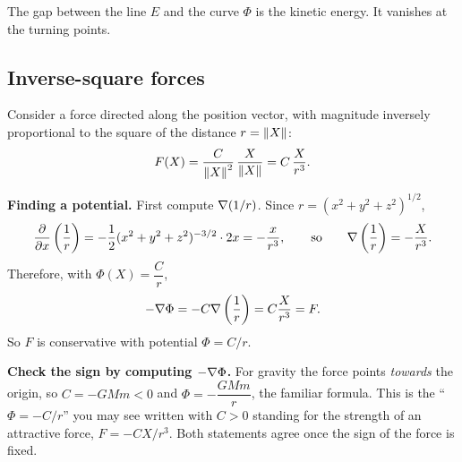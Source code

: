 \begin{center}

{\small\color{navy} The gap between the line $E$ and the curve $\Phi$ is the kinetic
energy. It vanishes at the turning points.}
\end{center}

\subsection{Inverse-square forces}

Consider a force directed along the position vector, with magnitude inversely
proportional to the square of the distance $r=\left\lVert X\right\rVert$:
\[ F(X)=\frac{C}{\left\lVert X\right\rVert^2}\,\frac{X}{\left\lVert X\right\rVert}=C\,\frac{X}{r^3}. \]

\textbf{Finding a potential.} First compute $\nabla(1/r)$. Since
$r=(x^2+y^2+z^2)^{1/2}$,
\[
\frac{\partial }{\partial x}\left(\frac1r\right)=-\frac12(x^2+y^2+z^2)^{-3/2}\cdot2x=-\frac{x}{r^3},
\qquad\text{so}\qquad \nabla\left(\frac1r\right)=-\frac{X}{r^3}.
\]
Therefore, with $\Phi(X)=\dfrac{C}{r}$,
\[ -\nabla\Phi=-C\nabla\left(\frac1r\right)=C\frac{X}{r^3}=F . \]
So $F$ is conservative with potential $\Phi=C/r$.

\begin{trap}
\textbf{Check the sign by computing $-\nabla\Phi$.} For gravity the force points
\emph{towards} the origin, so $C=-GMm<0$ and $\Phi=-\dfrac{GMm}{r}$, the familiar formula.
This is the ``$\Phi=-C/r$'' you may see written with $C>0$ standing for the strength of an
attractive force, $F=-C X/r^3$. Both statements agree once the sign of the force is fixed.
\end{trap}

